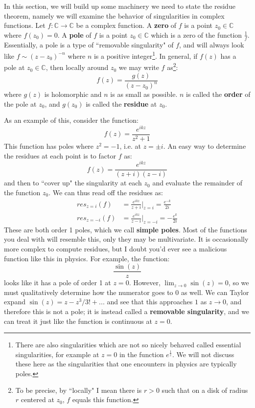 \documentclass[11pt, oneside]{article}   	%
\theoremstyle{definition}
\begin{document}
In this section, we will build up some machinery we need to state the residue theorem, namely we will examine the 
behavior of singularities in complex functions. Let $f : \mathbb C\rightarrow \mathbb C$ be a complex function. A 
\textbf{zero} of $f$ is a point $z_0\in\mathbb C$ where $f(z_0) = 0$. A \textbf{pole} of $f$ is a point $z_0\in\mathbb C$ 
which is a zero of the function $\frac{1}{f}$. Essentially, a pole is a type of ``removable singularity" of $f$, and will always 
look like $f\sim (z - z_0)^{-n}$ where $n$ is a positive integer\footnote{There 
are also singularities which are not so nicely behaved called essential singularities, for example at $z = 0$ in the function 
$e^{\frac{1}{z}}$. We will not discuss these here as the singularities that one encounters in physics are typically poles.}. 
In general, if $f(z)$ has a pole at $z_0\in\mathbb C$, then locally around $z_0$ we may write $f$ as\footnote{To be 
precise, by ``locally" I mean there is $r > 0$ such that on a disk of radius $r$ centered at $z_0$, $f$ equals this function.}:
\begin{equation}
	f(z) = \frac{g(z)}{(z - z_0)^n}
\end{equation}
where $g(z)$ is holomorphic and $n$ is as small as possible. $n$ is called the \textbf{order} of the pole at $z_0$, and 
$g(z_0)$ is called the \textbf{residue} at $z_0$. 

As an example of this, consider the function:
\begin{equation}
	f(z) = \frac{e^{ikz}}{z^2 + 1}
\end{equation}
This function has poles where $z^2 = -1$, i.e. at $z = \pm i$. An easy way to determine the residues at each point is to 
factor $f$ as:
\begin{equation}
	f(z) = \frac{e^{ikz}}{(z + i)(z - i)}
\end{equation}
and then to ``cover up" the singularity at each $z_0$ and evaluate the remainder of the function $z_0$. We can thus read off 
the residues as:
\begin{align}
	res_{z = i}(f) &= \frac{e^{ikz}}{z + i}\bigg|_{z = i} = \frac{e^{-k}}{2i} \nonumber\\
	res_{z = -i}(f) &= \frac{e^{ikz}}{z - i}\bigg|_{z = -i} = -\frac{e^k}{2i}
\end{align}
These are both order 1 poles, which we call \textbf{simple poles}. Most of the functions you deal with will resemble this, only 
they may be multivariate. It is occasionally more complex to compute residues, but I doubt you'd ever see a malicious 
function like this in physics. For example, the function:
\begin{equation}
	\frac{\sin(z)}{z}
\end{equation}
looks like it has a pole of order 1 at $z = 0$. However, $\lim_{z\rightarrow 0}\sin(z) = 0$, so we must qualitatively determine 
how the numerator goes to 0 as well. We can Taylor expand $\sin(z) = z - z^3/3! + ...$ and see that this approaches $1$ as 
$z\rightarrow 0$, and therefore this is not a pole; it is instead called a \textbf{removable singularity}, and we can treat it just 
like the function is continuous at $z = 0$. 
\end{document}
